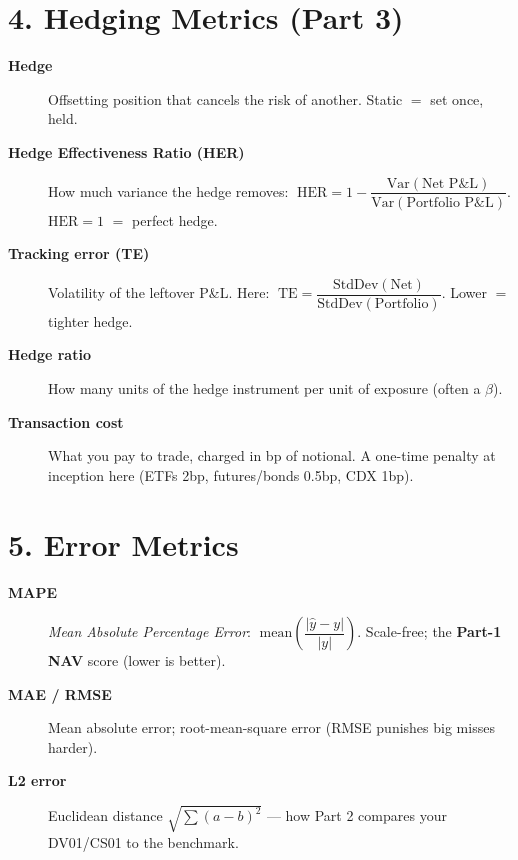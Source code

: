\documentclass[10pt]{article}
\newcommand{\term}[1]{\textcolor{term}{\textbf{#1}}}
\begin{document}
\section{4. Hedging Metrics (Part 3)}
\begin{description}
\item[\term{Hedge}] Offsetting position that cancels the risk of another. Static $=$ set once, held.
\item[\term{Hedge Effectiveness Ratio (HER)}] How much variance the hedge removes:
$\;\mathrm{HER} = 1 - \dfrac{\mathrm{Var}(\text{Net P\&L})}{\mathrm{Var}(\text{Portfolio P\&L})}$.
$\mathrm{HER}=1$ $=$ perfect hedge.
\item[\term{Tracking error (TE)}] Volatility of the leftover P\&L. Here:
$\;\mathrm{TE} = \dfrac{\mathrm{StdDev}(\text{Net})}{\mathrm{StdDev}(\text{Portfolio})}$. Lower $=$ tighter hedge.
\item[\term{Hedge ratio}] How many units of the hedge instrument per unit of exposure (often a $\beta$).
\item[\term{Transaction cost}] What you pay to trade, charged in bp of notional. A one-time penalty at
inception here (ETFs 2bp, futures/bonds 0.5bp, CDX 1bp).
\end{description}

\section{5. Error Metrics}
\begin{description}
\item[\term{MAPE}] \emph{Mean Absolute Percentage Error}:
$\;\mathrm{mean}\!\left(\dfrac{|\hat{y}-y|}{|y|}\right)$. Scale-free; the \textbf{Part-1 NAV} score (lower is better).
\item[\term{MAE / RMSE}] Mean absolute error; root-mean-square error (RMSE punishes big misses harder).
\item[\term{L2 error}] Euclidean distance $\sqrt{\sum(a-b)^2}$ — how Part 2 compares your DV01/CS01 to the benchmark.
\end{description}

\end{document}
